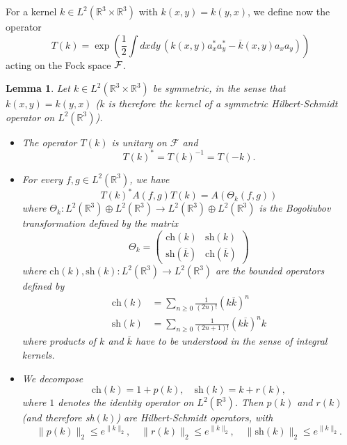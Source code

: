\documentclass[11pt,a4paper]{article}
\newtheorem{lem}[thm]{Lemma}
\newcommand{\bR}{{\mathbb R}}
\newcommand{\cF}{{\cal F}}
\newcommand{\R}{\mathbb{R}}
\begin{document}
\medskip

For a kernel $k \in L^2 (\bR^3 \times \bR^3)$ with $k (x,y) = k(y,x)$, we define now the operator 
\begin{equation}\label{eq:Tk-def} T (k) = \exp \left(\frac{1}{2} \int dx dy \, \left(k(x,y) a_x^* a_y^* - \overline{k} (x,y) a_x a_y \right) \right) \end{equation} 
acting on the Fock space $\cF$. 
\begin{lem} \label{l:bt}
Let $k \in L^2(\R^3 \times \R^3)$ be symmetric, in the sense that $k(x,y) = k(y,x)$ ($k$ is therefore the kernel of a symmetric Hilbert-Schmidt operator on $L^2 (\bR^3)$). 
\begin{itemize}
\item[(i)] The operator $T(k)$ is unitary on $\mathcal{F}$ and
  \[
    T(k)^* = T(k)^{-1} = T(-k).
  \]
\item[(ii)] For every $f,g \in L^2 (\bR^3)$, we have 
\begin{equation}\label{eq:TAT} T (k)^* A(f,g) T(k) = A (\Theta_k (f,g)) \end{equation}
where $\Theta_k : L^2 (\bR^3) \oplus L^2 (\bR^3) \to L^2 (\bR^3) \oplus L^2 (\bR^3)$ is the Bogoliubov transformation defined by the matrix 
\[ \Theta_k = \left(\begin{array}{ll} \text{ch} (k)  & \text{sh} (k)  \\ \text{sh} (\overline{k}) & \text{ch} (\overline{k}) \end{array} \right) \]
where $\text{ch} (k), \text{sh} (k) : L^2 (\bR^3) \to L^2 (\bR^3)$ are the bounded operators defined by 
\[ \begin{split} 
\text{ch} (k) & = \sum_{n\geq 0} \frac{1}{(2n)!} (k\overline{k})^n \\
\text{sh} (k)  & = \sum_{n \geq 0} \frac{1}{(2n+1)!} (k\overline{k})^n k \end{split} \]
where products of $k$ and $\overline{k}$ have to be understood in the sense of integral kernels. 
\item[(iii)] We decompose 
\begin{equation}\label{eq:pr-def} \text{ch} (k) = 1 + p (k) , \quad \text{sh} (k) = k + r (k), \end{equation}
where $1$ denotes the identity operator on $L^2 (\bR^3)$. Then $p (k)$ and $r (k)$ (and therefore sh$(k)$) are Hilbert-Schmidt operators, with 
\begin{equation}
 \| p (k) \|_{2}  \le e^{\| k \|_{2}}, \quad 
\| r (k) \|_{2} \le e^{\| k \|_{2}},  \quad \| \text{sh} (k) \|_2 \leq  e^{\| k \|_{2}}.

\end{equation}
\end{itemize}
\end{lem}
\end{document}
